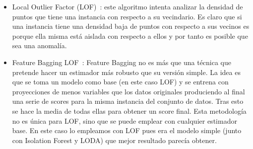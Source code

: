 \begin{itemize}
	\item Local Outlier Factor (LOF)~\cite{breunig2000lof}: este algoritmo intenta analizar la densidad de puntos que tiene una instancia con respecto a su vecindario. Es claro que si una instancia tiene una densidad baja de puntos con respecto a sus vecinos es porque ella misma está aislada con respecto a ellos y por tanto es posible que sea una anomalía.
	\item Feature Bagging LOF~\cite{10.1145/1081870.1081891}: Feature Bagging no es más que una técnica que pretende hacer un estimador más robusto que su versión simple. La idea es que se toma un modelo como base (en este caso LOF) y se entrena con proyecciones de menos variables que los datos originales produciendo al final una serie de scores para la misma instancia del conjunto de datos. Tras esto se hace la media de todas ellas para obtener un score final. Esta metodología no es única para LOF, sino que se puede emplear con cualquier estimador base. En este caso lo empleamos con LOF pues era el modelo simple (junto con Isolation Forest y LODA) que mejor resultado parecía obtener.
\end{itemize}